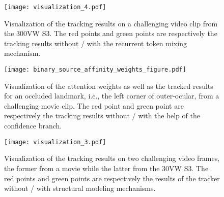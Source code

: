 \documentclass[review]{elsarticle}
\begin{document}
\begin{figure}
	\centering
	\texttt{[image: visualization\_4.pdf]}
	\caption{Visualization of the tracking results on a challenging video clip from the 300VW S3. The \textcolor[RGB]{192,0,0}{red points} and \textcolor[RGB]{0,192,0}{green points} are respectively the tracking results without / with the recurrent token mixing mechanism.}
	\label{vis_4}
\end{figure}
\begin{figure}
	\centering
	\texttt{[image: binary\_source\_affinity\_weights\_figure.pdf]}
	\caption{Visualization of the attention weights as well as the tracked results for an occluded landmark, i.e., the left corner of outer-ocular, from a challenging movie clip. The \textcolor[RGB]{192,0,0}{red point} and \textcolor[RGB]{0,192,0}{green point} are respectively the tracking results without / with the help of the confidence branch.}
\label{vis_3}
\end{figure}
\begin{figure}[h]
\centering
\texttt{[image: visualization\_3.pdf]}
\caption{Visualization of the tracking results on two challenging video frames, the former from a movie while the latter from the 30VW S3. The \textcolor[RGB]{192,0,0}{red points} and \textcolor[RGB]{0,192,0}{green points} are respectively the results of the tracker without / with structural modeling mechanisms.}
\label{vis_2}
\end{figure}
\end{document}

